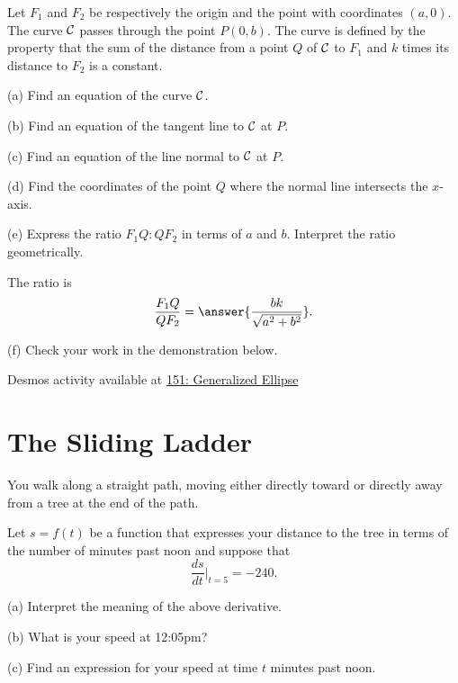 \documentclass{ximera}
\begin{document}
\begin{question}  \label{Q:JDJHDHD}
Let $F_1$ and $F_2$ be respectively the origin and the point with coordinates $(a,0)$. The curve ${\cal C}$ passes through the point $P(0,b)$. The curve is defined by the property that the sum of the distance from a point $Q$ of ${\cal C}$ to $F_1$ and $k$ times its distance to $F_2$ is a constant.

(a) Find an equation of the curve ${\cal C}$.

(b) Find an equation of the tangent line to ${\cal C}$ at $P$.

(c) Find an equation of the line normal to ${\cal C}$ at $P$.

(d) Find the coordinates of the point $Q$ where the normal line intersects the $x$-axis.

(e) Express the ratio $F_1 Q : Q F_2$ in terms of $a$ and $b$. Interpret the ratio geometrically.

The ratio is
\[
    \frac{F_1 Q}{Q F_2} = \answer{\frac{bk}{\sqrt{a^2+b^2}}} . 
\]

(f) Check your work in the demonstration below.

\begin{onlineOnly}
    \begin{center}
\end{center}
\end{onlineOnly}

Desmos activity available at \href{https://www.desmos.com/calculator/uz7w5uh0vl}{151: Generalized Ellipse}

\end{question}


\section*{The Sliding Ladder}
\begin{question}  \label{Q:43543554LL}
You walk along a straight path, moving either directly toward or directly away from a tree at the end of the path.

Let $s = f(t)$ be a function that expresses your distance to the tree in terms of the number of minutes past noon and suppose that
\[
     \frac{ds}{dt}\Big|_{t=5} = -240 .
\]

(a) Interpret the meaning of the above derivative.

(b) What is your speed at 12:05pm?

(c) Find an expression for your speed at time $t$ minutes past noon.
\end{question}
\end{document}
